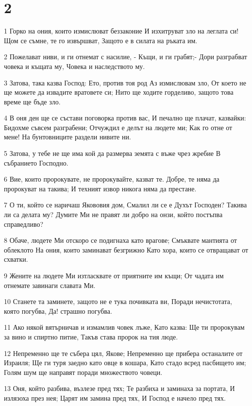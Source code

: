 \chapter{2}

\par 1 Горко на ония, които измислюват беззаконие И изхитруват зло на леглата си! Щом се съмне, те го извършват, Защото е в силата на ръката им.
\par 2 Пожелават ниви, и ги отнемат с насилие, - Къщи, и ги грабят;- Дори разграбват човека и къщата му, Човека и наследството му.
\par 3 Затова, така казва Господ: Ето, против тоя род Аз измислювам зло, От което не ще можете да извадите вратовете си; Нито ще ходите горделиво, защото това време ще бъде зло.
\par 4 В оня ден ще се състави поговорка против вас, И печално ще плачат, казвайки: Бидохме съвсем разграбени; Отчуждил е делът на людете ми; Как го отне от мене! На бунтовниците раздели нивите ни.
\par 5 Затова, у тебе не ще има кой да размерва земята с въже чрез жребие В събранието Господно.
\par 6 Вие, които пророкувате, не пророкувайте, казват те. Добре, те няма да пророкуват на такива; И техният извор никога няма да престане.
\par 7 О ти, който се наричаш Якововия дом, Смалил ли се е Духът Господен? Такива ли са делата му? Думите Ми не правят ли добро на онзи, който постъпва справедливо?
\par 8 Обаче, людете Ми отскоро се подигнаха като врагове; Смъквате мантията от облеклото На ония, които заминават безгрижно Като хора, които се отвращават от схватки.
\par 9 Жените на людете Ми изтласквате от приятните им къщи; От чадата им отнемате завинаги славата Ми.
\par 10 Станете та заминете, защото не е тука почивката ви, Поради нечистотата, която погубва, Да! страшно погубва.
\par 11 Ако някой вятърничав и измамлив човек лъже, Като казва: Ще ти пророкувам за вино и спиртно питие, Такъв става пророк на тия люде.
\par 12 Непременно ще те събера цял, Якове; Непременно ще прибера останалите от Израиля; Ще ги туря заедно като овце в кошара, Като стадо всред пасбището им; Голям шум ще направят поради множеството човеци.
\par 13 Оня, който разбива, възлезе пред тях; Те разбиха и заминаха за портата, И излязоха през нея; Царят им замина пред тях, И Господ е начело пред тях.


